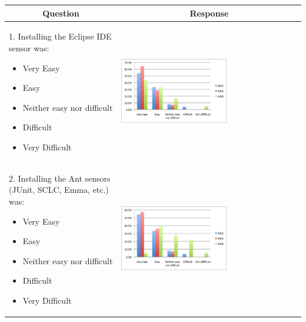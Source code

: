 \documentclass[11pt]{article}
\begin{document}
\begin{center}
\footnotesize
\begin{longtable}{|m{}|m{}|}
\hline 
\multicolumn{1}{|c|}{\bf Question} & \multicolumn{1}{c|}{\bf Response} \\ \hline
1. Installing the Eclipse IDE sensor was:
\begin{itemize}
\item Very Easy
\item Easy
\item Neither easy nor difficult
\item Difficult
\item Very Difficult
\end{itemize}
&
\includegraphics[width=0.6\textwidth]{compare-1} \\ \hline

2. Installing the Ant sensors (JUnit, SCLC, Emma, etc.) was:
\begin{itemize}
\item Very Easy
\item Easy
\item Neither easy nor difficult
\item Difficult
\item Very Difficult
\end{itemize}
&
\includegraphics[width=0.6\textwidth]{compare-2} \\ \hline

\end{longtable}
\end{center}
\end{document}
